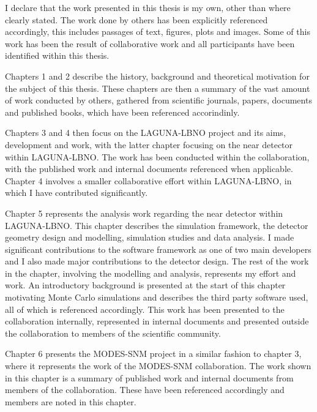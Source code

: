\begin{declaration} 
I declare that the work presented in this thesis is my own, other than where clearly stated. The work done by others has been explicitly referenced accordingly, this includes passages of text, figures, plots and images. Some of this work has been the result of collaborative work and all participants have been identified within this thesis. 


Chapters 1 and 2 describe the history, background and theoretical motivation for the subject of this thesis. These chapters are then a summary of the vast amount of work conducted by others, gathered from scientific journals, papers, documents and published books, which have been referenced accorindinly.

Chapters 3 and 4 then focus on the LAGUNA-LBNO project and its aims, development and work, with the latter chapter focusing on the near detector within LAGUNA-LBNO. The work has been conducted within the collaboration, with the published work and internal documents referenced when applicable. Chapter 4 involves a smaller collaborative effort within LAGUNA-LBNO, in which I have contributed significantly.

Chapter 5 represents the analysis work regarding the near detector within LAGUNA-LBNO. This chapter describes the simulation framework, the detector geometry design and modelling, simulation studies and data analysis. I made significant contributions to the software framework as one of two main developers and I also made major contributions to the detector design. The rest of the work in the chapter, involving the modelling and analysis, represents my effort and work. An introductory background is presented at the start of this chapter motivating Monte Carlo simulations and describes the third party software used, all of which is referenced accordingly. This work has been presented to the collaboration internally, represented in internal documents and presented outside the collaboration to members of the scientific community.

Chapter 6 presents the MODES-SNM project in a similar fashion to chapter 3, where it represents the work of the MODES-SNM collaboration. The work shown in this chapter is a summary of published work and internal documents from members of the collaboration. These have been referenced accordingly and members are noted in this chapter.


\end{declaration}

